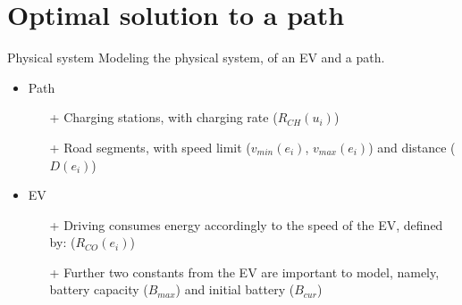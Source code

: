 \section{Optimal solution to a path}

\begin{frame}{Physical system}
Modeling the physical system, of an EV and a path.
\begin{figure}[!htb]
\centering
\end{figure} 
\begin{itemize}
\item Path
\begin{itemize}
\item[+] Charging stations, with charging rate ($R_{CH}(u_i)$)
\item[+] Road segments, with speed limit ($v_{min}(e_i)$, $v_{max}(e_i)$) and distance ($D(e_i)$) 
\end{itemize}
\item EV
\begin{itemize}
\item[+] Driving consumes energy accordingly to the speed of the EV, defined by: ($R_{CO}(e_i)$)
\item[+] Further two constants from the EV are important to model, namely, battery capacity ($B_{max}$) and initial battery ($B_{cur}$)
\end{itemize}
\end{itemize} 

\end{frame}


